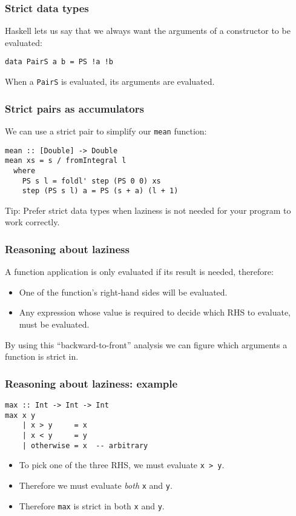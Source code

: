 \documentclass{beamer}
\begin{document}
\begin{frame}[fragile]
  \frametitle{Strict data types}

  Haskell lets us say that we always want the arguments of a
  constructor to be evaluated:

\begin{lstlisting}
data PairS a b = PS !a !b
\end{lstlisting}

  When a \lstinline!PairS! is evaluated, its arguments are evaluated.
\end{frame}

\begin{frame}[fragile]
  \frametitle{Strict pairs as accumulators}

  We can use a strict pair to simplify our \lstinline!mean! function:

  \begin{lstlisting}
mean :: [Double] -> Double
mean xs = s / fromIntegral l
  where
    PS s l = foldl' step (PS 0 0) xs
    step (PS s l) a = PS (s + a) (l + 1)
  \end{lstlisting}

  Tip: Prefer strict data types when laziness is not needed for your
  program to work correctly.

\end{frame}

\begin{frame}[fragile]
  \frametitle{Reasoning about laziness}

  A function application is only evaluated if its result is needed,
  therefore:
  \begin{itemize}
  \item One of the function's right-hand sides will be evaluated.
  \item Any expression whose value is required to decide which RHS to
    evaluate, must be evaluated.
  \end{itemize}
  By using this ``backward-to-front'' analysis we can figure which
  arguments a function is strict in.
\end{frame}

\begin{frame}[fragile]
  \frametitle{Reasoning about laziness: example}

  \begin{lstlisting}
max :: Int -> Int -> Int
max x y
    | x > y     = x
    | x < y     = y
    | otherwise = x  -- arbitrary
  \end{lstlisting}

  \begin{itemize}
  \item To pick one of the three RHS, we must evaluate \lstinline!x > y!.
  \item Therefore we must evaluate \emph{both} \lstinline!x! and
    \lstinline!y!.
  \item Therefore \lstinline!max! is strict in both \lstinline!x! and
    \lstinline!y!.
  \end{itemize}
\end{frame}
\end{document}
